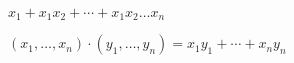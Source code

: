 $x_1 + x_1 x_2 + \cdots + x_1 x_2 \ldots x_n$

$(x_1, \ldots  , x_n ) \cdot (y_1 , \ldots , y_n ) =
x_1 y_1 + \cdots + x_n y_n$


\bye

